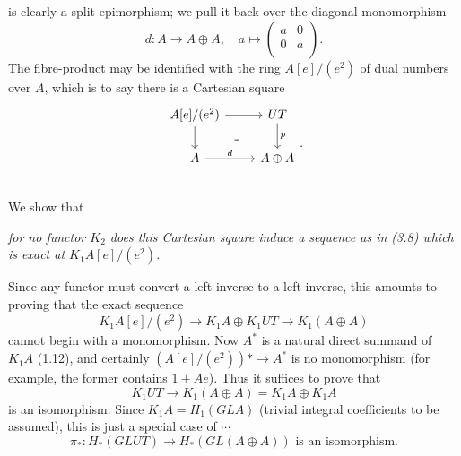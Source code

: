 \documentclass[openany,leqno]{book}  %
\begin{document}
is clearly a split epimorphism; we pull it back over the diagonal monomorphism 
\[d\colon  A\longrightarrow A\oplus A,\quad a \mapsto \begin{pmatrix}
a  & 0\\
0& a\\
\end{pmatrix}.\]
The fibre-product may be identified with the ring $A[e]/(e^2)$ of dual numbers over $A$, which is to say there is a Cartesian square 
\[\begin{tikzcd}
A[e]/(e^2) \arrow{r} \arrow{d} \arrow[dr, phantom, "\lrcorner"]& UT \arrow{d}{p}\\
A \arrow{r}{d} & A\oplus A \\
\end{tikzcd}.\]
We show that

{\em for no functor $K_2$ does this Cartesian square induce a sequence as in (3.8) which is exact at $K_1A[e]/(e^2)$.
}

Since any functor must convert a left inverse to a left inverse, this amounts to proving that the exact sequence
\[K_1 A[e]/(e^2) \longrightarrow K_1A\oplus K_1UT  \longrightarrow K_1(A \oplus A)\]
cannot begin with a monomorphism. Now $A^*$ is a natural direct summand of $K_1A$ (1.12), and certainly $(A[e] /(e^2))* \longrightarrow A^*$ is no monomorphism (for example, the former contains $1 + Ae$). Thus it suffices to prove that
\[K_1UT\longrightarrow K_1(A\oplus A) = K_1A\oplus K_1A\]
is an isomorphism. Since $K_1 A = H_1 (GLA)$ (trivial integral coefficients to be assumed), this is just a special case of $\cdots$
\begin{equation}
 \pi_*\colon   H_*(GLUT) \longrightarrow H_*(GL(A \oplus A)) \text{ is an isomorphism.}
\end{equation}
 
\end{document}
